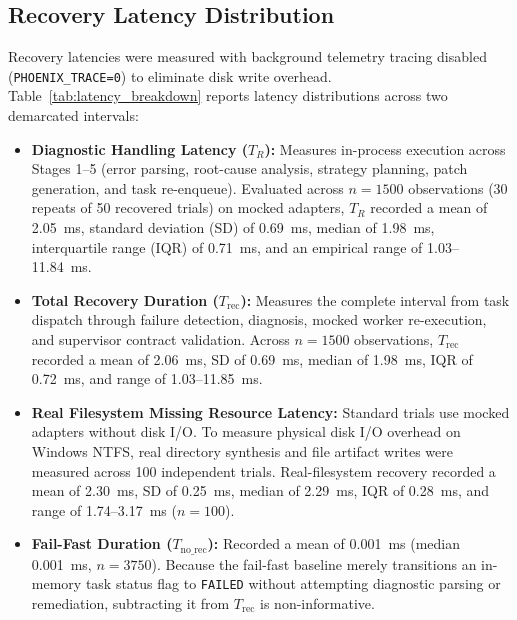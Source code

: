 \documentclass[conference]{IEEEtran}
\newcommand{\chg}[1]{{\color{blue}#1}}
\begin{document}
\subsection{\chg{Recovery Latency Distribution}}
\chg{Recovery latencies were measured with background telemetry tracing disabled (\texttt{PHOENIX\_TRACE=0}) to eliminate disk write overhead. Table~\ref{tab:latency_breakdown} reports latency distributions across two demarcated intervals:}
\begin{itemize}
    \item \chg{\textbf{Diagnostic Handling Latency ($T_R$):} Measures in-process execution across Stages 1--5 (error parsing, root-cause analysis, strategy planning, patch generation, and task re-enqueue). Evaluated across $n=1500$ observations (30 repeats of 50 recovered trials) on mocked adapters, $T_R$ recorded a mean of 2.05~ms, standard deviation (SD) of 0.69~ms, median of 1.98~ms, interquartile range (IQR) of 0.71~ms, and an empirical range of 1.03--11.84~ms.}
    \item \chg{\textbf{Total Recovery Duration ($T_{\text{rec}}$):} Measures the complete interval from task dispatch through failure detection, diagnosis, mocked worker re-execution, and supervisor contract validation. Across $n=1500$ observations, $T_{\text{rec}}$ recorded a mean of 2.06~ms, SD of 0.69~ms, median of 1.98~ms, IQR of 0.72~ms, and range of 1.03--11.85~ms.}
    \item \chg{\textbf{Real Filesystem Missing Resource Latency:} Standard trials use mocked adapters without disk I/O. To measure physical disk I/O overhead on Windows NTFS, real directory synthesis and file artifact writes were measured across 100 independent trials. Real-filesystem recovery recorded a mean of 2.30~ms, SD of 0.25~ms, median of 2.29~ms, IQR of 0.28~ms, and range of 1.74--3.17~ms ($n=100$).}
    \item \chg{\textbf{Fail-Fast Duration ($T_{\text{no\_rec}}$):} Recorded a mean of 0.001~ms (median 0.001~ms, $n=3750$). Because the fail-fast baseline merely transitions an in-memory task status flag to \texttt{FAILED} without attempting diagnostic parsing or remediation, subtracting it from $T_{\text{rec}}$ is non-informative.}
\end{itemize}
\end{document}
